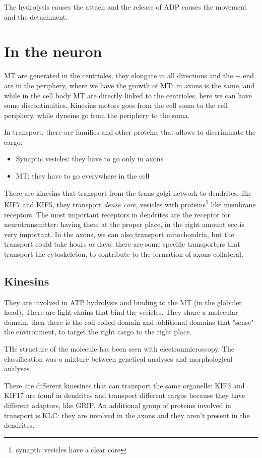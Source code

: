\documentclass[a4paper, 12pt]{book}
\begin{document}
The hydrolysis causes the attach and the release of ADP causes the movement and the detachment. 


\section{In the neuron}
MT are generated in the centrioles, they elongate in all directions and the + end are in the periphery, where we have the growth of MT: in axons is the same, and while in the cell body MT are directly linked to the centrioles, here we can have some discontinuities. Kinesins motors goes from the cell soma to the cell periphery, while dyneins go from the periphery to the soma.

In transport, there are families and other proteins that allows to discriminate the cargo: 
\begin{itemize}
\item{Synaptic vesicles: they have to go only in axons}
\item{MT: they have to go  everywhere in the cell}
\end{itemize}

There are kinesins that transport from the trans-golgi network to dendrites, like KIF7 and KIF5, they transport \emph{dense core}, vesicles with proteins\footnote{synaptic vesicles have a clear core} like membrane receptors. The most important receptors in dendrites are the receptor for neurotransmitter: having them at the proper place, in the right amount ecc is very important. In the axons, we can also transport mitochondria, but the transport could take hours or days: there are some specific transporters that transport the cytoskeleton, to contribute to the formation of axons collateral. 


\subsection{Kinesins}
They are involved in ATP hydrolysis and binding to the MT (in the globuler head). There are light chains that bind the vesicles. They share a molecular domain, then there is the coil-coiled domain and additional domains that "sense" the environment, to target the right cargo to the right place. 
 
THe structure of the molecule has been seen with electronmicroscopy. The classification was a mixture between genetical analyses and morphological analyses. 

There are different kinesines that can transport the same organelle: KIF3 and KIF17 are founf in dendrites and transport different cargos because they have different adaptors, like GRIP. An additional group of proteins involved in transport is KLC: they are involved in the axons and they aren't present in the dendrites.
\end{document}

